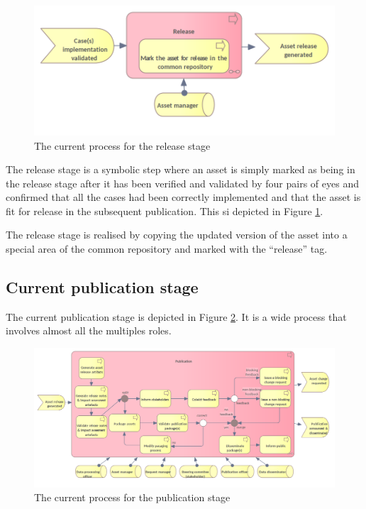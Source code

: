 	\begin{figure}[h]
		\centering
		\includegraphics[width=.6\textwidth]{images/business/current/Release.png}
		\caption{The current process for the release stage}
		\label{fig:release-current}
	\end{figure}

	The release stage is a symbolic step where an asset is simply marked as being in the release stage after it has been verified and validated by four pairs of eyes and confirmed that all the cases had been correctly implemented and that the asset is fit for release in the subsequent publication. This si depicted in Figure \ref{fig:release-current}.

	The release stage is realised by copying the updated version of the asset into a special area of the common repository and marked with the ``release'' tag.

	\subsection{Current publication stage}
	
	The current publication stage is depicted in Figure \ref{fig:publication-current}. It is a wide process that involves almost all the multiples roles. 
	
	\label{sec:publication-current}
		\begin{figure}[h]
		\centering
		\includegraphics[width=1.03\textwidth]{images/business/current/Publication.png}
		\caption{The current process for the publication stage}
		\label{fig:publication-current}
	\end{figure}


